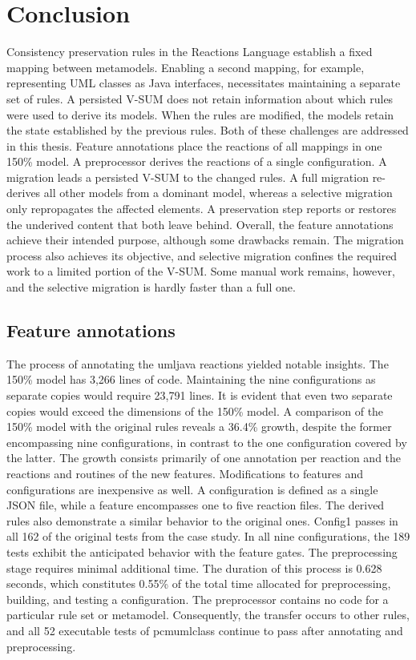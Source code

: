 \chapter{Conclusion}
\label{ch:Conclusion}

Consistency preservation rules in the Reactions Language establish a fixed mapping between metamodels.
Enabling a second mapping, for example, representing UML classes as Java interfaces, necessitates maintaining a separate set of rules.
A persisted V-SUM does not retain information about which rules were used to derive its models.
When the rules are modified, the models retain the state established by the previous rules.
Both of these challenges are addressed in this thesis.
Feature annotations place the reactions of all mappings in one 150\% model.
A preprocessor derives the reactions of a single configuration.
A migration leads a persisted V-SUM to the changed rules.
A full migration re-derives all other models from a dominant model, whereas a selective migration only repropagates the affected elements.
A preservation step reports or restores the underived content that both leave behind.
Overall, the feature annotations achieve their intended purpose, although some drawbacks remain.
The migration process also achieves its objective, and selective migration confines the required work to a limited portion of the V-SUM.
Some manual work remains, however, and the selective migration is hardly faster than a full one.

\section{Feature annotations}
\label{sec:Conclusion:FeatureAnnotations}

The process of annotating the umljava reactions yielded notable insights.
The 150\% model has 3,266 lines of code.
Maintaining the nine configurations as separate copies would require 23,791 lines.
It is evident that even two separate copies would exceed the dimensions of the 150\% model.
A comparison of the 150\% model with the original rules reveals a 36.4\% growth, despite the former encompassing nine configurations, in contrast to the one configuration covered by the latter.
The growth consists primarily of one annotation per reaction and the reactions and routines of the new features.
Modifications to features and configurations are inexpensive as well.
A configuration is defined as a single JSON file, while a feature encompasses one to five reaction files.
The derived rules also demonstrate a similar behavior to the original ones.
Config1 passes in all 162 of the original tests from the case study.
In all nine configurations, the 189 tests exhibit the anticipated behavior with the feature gates.
The preprocessing stage requires minimal additional time.
The duration of this process is 0.628 seconds, which constitutes 0.55\% of the total time allocated for preprocessing, building, and testing a configuration.
The preprocessor contains no code for a particular rule set or metamodel.
Consequently, the transfer occurs to other rules, and all 52 executable tests of pcmumlclass continue to pass after annotating and preprocessing.

